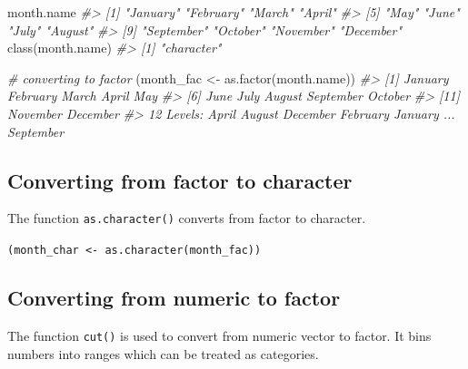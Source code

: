 \documentclass[
]{book}
\newenvironment{Shaded}{\begin{snugshade}}{\end{snugshade}}
\newcommand{\CommentTok}[1]{\textcolor[rgb]{0.56,0.35,0.01}{\textit{#1}}}
\newcommand{\FunctionTok}[1]{\textcolor[rgb]{0.00,0.00,0.00}{#1}}
\newcommand{\NormalTok}[1]{#1}
\newcommand{\OtherTok}[1]{\textcolor[rgb]{0.56,0.35,0.01}{#1}}
\begin{document}
\begin{Shaded}
\begin{Highlighting}[]
\NormalTok{month.name}
\CommentTok{\#\textgreater{}  [1] "January"   "February"  "March"     "April"    }
\CommentTok{\#\textgreater{}  [5] "May"       "June"      "July"      "August"   }
\CommentTok{\#\textgreater{}  [9] "September" "October"   "November"  "December"}
\FunctionTok{class}\NormalTok{(month.name)}
\CommentTok{\#\textgreater{} [1] "character"}

\CommentTok{\# converting to factor}
\NormalTok{(month\_fac }\OtherTok{\textless{}{-}} \FunctionTok{as.factor}\NormalTok{(month.name))}
\CommentTok{\#\textgreater{}  [1] January   February  March     April     May      }
\CommentTok{\#\textgreater{}  [6] June      July      August    September October  }
\CommentTok{\#\textgreater{} [11] November  December }
\CommentTok{\#\textgreater{} 12 Levels: April August December February January ... September}
\end{Highlighting}
\end{Shaded}

\hypertarget{converting-from-factor-to-character}{%
\subsection{Converting from factor to character}\label{converting-from-factor-to-character}}

The function \texttt{as.character()} converts from factor to character.

\texttt{(month\_char\ \textless{}-\ as.character(month\_fac))}

\hypertarget{converting-from-numeric-to-factor}{%
\subsection{Converting from numeric to factor}\label{converting-from-numeric-to-factor}}

The function \texttt{cut()} is used to convert from numeric vector to factor. It bins numbers into ranges which can be treated as categories.
\end{document}
